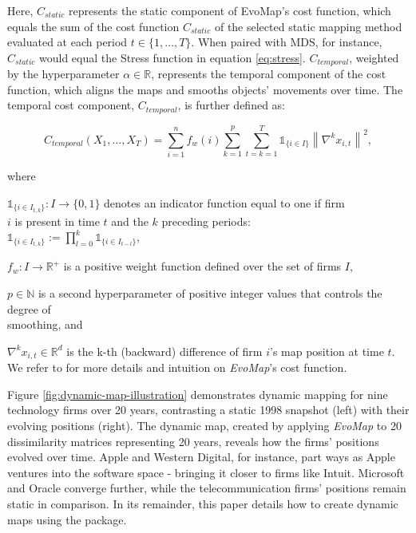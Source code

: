 \documentclass[article]{jss}
\begin{document}
Here, $C_{static}$ represents the static component of EvoMap’s cost function, which equals
the sum of the cost function $C_{static}$ of the selected static mapping method evaluated at each period
$t \in \{1, \ldots, T\}$. When paired with MDS, for instance, $C_{static}$ would equal the Stress function in
equation \ref{eq:stress}. $C_{temporal}$, weighted by the hyperparameter $\alpha \in \mathbb{R}$, represents the temporal component of the cost function, which
aligns the maps and smooths objects’ movements over time. The temporal cost component, $C_{temporal}$, is
further defined as:

\begin{equation} \label{eq:cost-temporal}
  C_{temporal}(X_1, \ldots, X_T) = \sum_{i=1}^n{f_w(i)} \sum_{k=1}^p \sum_{t=k=1}^T \mathds{1}_{\{i \in I\}} \left\| \nabla^k x_{i,t} \right\|^2,
\end{equation}

where \\
\begin{description}
  \item $\mathds{1}_{\{i \in I_{t,k}\}}: I \rightarrow \{0,1\}$ denotes an indicator function equal to one if firm \\
   $i$ is present in time $t$ and the $k$ preceding periods: \\
  $\mathds{1}_{\{i \in I_{t,k}\}} := \prod_{l=0}^k \mathds{1}_{\{i \in I_{t-l}\}}$, \\
  \item $f_w : I \rightarrow \mathbb{R}^+$ is a positive weight function defined over the set of firms $I$, \\
  \item $p \in \mathbb{N}$ is a second hyperparameter of positive integer values that controls the degree of \\ 
  smoothing, and \\
  \item $\nabla^kx_{i,t} \in \mathbb{R}^d$ is the k-th (backward) difference of firm $i$’s map position at time $t$. \\ 
  We refer to \cite{Matthe+Ringel+Skiera:2023} for more details and intuition on \emph{EvoMap}'s cost function.
\end{description}

Figure \ref{fig:dynamic-map-illustration} demonstrates dynamic mapping for nine technology firms over 20 years, 
contrasting a static 1998 snapshot (left) with their evolving positions (right). The dynamic map, 
created by applying \emph{EvoMap} to 20 dissimilarity matrices representing 20 years, reveals how the firms' positions evolved over time. 
Apple and Western Digital, for instance, part ways as Apple ventures into the software space - bringing it closer to firms like Intuit. 
Microsoft and Oracle converge further, while the telecommunication firms’ positions
remain static in comparison. In its remainder, this paper details how to create dynamic maps
 using the  package.
\end{document}
